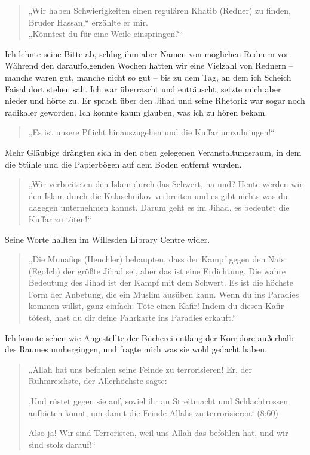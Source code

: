 \documentclass[12pt]{memoir}
\def\/{\discretionary{/}{}{/}}
\begin{document}
\begin{quote}
„Wir haben Schwierigkeiten einen regulären Khatib (Redner) zu finden,
Bruder Hassan,“ erzählte er mir.\\
„Könntest du für eine Weile einspringen?“
\end{quote}

Ich lehnte seine Bitte ab,
schlug ihm aber Namen von möglichen Rednern vor.
Während den darauffolgenden Wochen hatten wir eine Vielzahl von Rednern –
manche waren gut, manche nicht so gut –
bis zu dem Tag, an dem ich Scheich Faisal dort stehen sah.
Ich war überrascht und enttäuscht, setzte mich aber nieder und hörte zu.
Er sprach über den Jihad und seine Rhetorik
war sogar noch radikaler geworden.
Ich konnte kaum glauben, was ich zu hören bekam.

\begin{quote}
„Es ist unsere Pflicht hinauszugehen und die Kuffar umzubringen!“
\end{quote}

Mehr Gläubige drängten sich in den oben gelegenen Veranstaltungsraum,
in dem die Stühle und die Papierbögen auf dem Boden entfernt wurden.

\begin{quote}
„Wir verbreiteten den Islam durch das Schwert, na und?
Heute werden wir den Islam durch die Kalaschnikov verbreiten
und es gibt nichts was du dagegen unternehmen kannst.
Darum geht es im Jihad, es bedeutet die Kuffar zu töten!“
\end{quote}

Seine Worte hallten im Willesden Library Centre wider.

\begin{quote}
„Die Munafiqs (Heuchler) behaupten,
dass der Kampf gegen den Nafs (Ego\/Ich) der größte Jihad sei,
aber das ist eine Erdichtung.
Die wahre Bedeutung des Jihad ist der Kampf mit dem Schwert.
Es ist die höchste Form der Anbetung, die ein Muslim ausüben kann.
Wenn du ins Paradies kommen willst, ganz einfach:
Töte einen Kafir!
Indem du diesen Kafir tötest,
hast du dir deine Fahrkarte ins Paradies erkauft.“
\end{quote}

Ich konnte sehen wie Angestellte der Bücherei
entlang der Korridore außerhalb des Raumes umhergingen,
und fragte mich was sie wohl gedacht haben.

\begin{quote}
„Allah hat uns befohlen seine Feinde zu terrorisieren!
Er, der Ruhmreichste, der Allerhöchste sagte:

‚Und rüstet gegen sie auf, soviel ihr an Streitmacht
und Schlachtrossen aufbieten könnt,
um damit die Feinde Allahs zu terrorisieren.‘
(8:60)

Also ja! Wir sind Terroristen,
weil uns Allah das befohlen hat, und wir sind stolz darauf!“
\end{quote}
\end{document}
